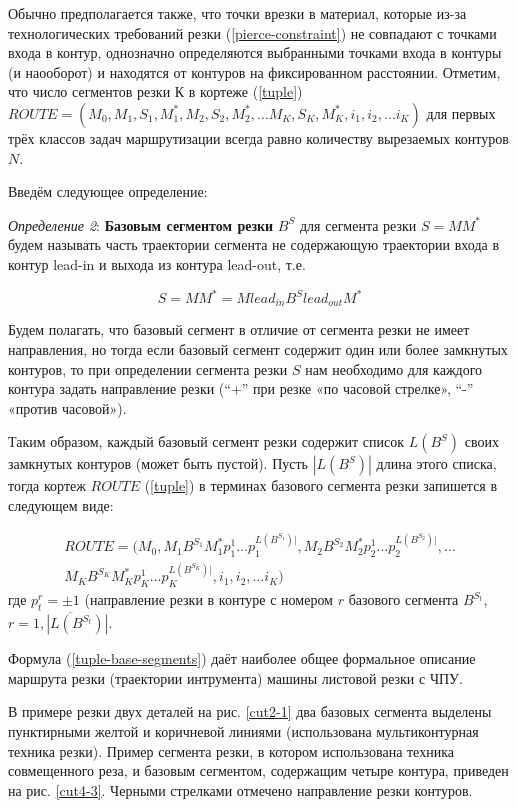 \documentclass[12pt]{report}
\begin{document}
Обычно предполагается также,
что точки врезки в материал,
которые из-за технологических требований резки
(\ref{pierce-constraint})
не совпадают с точками входа в контур,
однозначно определяются выбранными точками входа в контуры (и наооборот)
и находятся от контуров на фиксированном расстоянии.
Отметим, что число сегментов резки К в кортеже (\ref{tuple})
$ROUTE = (
  M_0, M_1, S_1, M_1^*, M_2, S_2, M_2^*, \dots M_K, S_K, M_K^*, i_1, i_2, \dots i_K
)$
для первых трёх классов задач маршрутизации всегда равно количеству вырезаемых контуров $N$.

Введём следующее определение:



{\it Определение 2}:
{\bf Базовым сегментом резки}
$B^S$
для сегмента резки
$S=MM^*$
будем называть часть траектории сегмента
не содержающую траектории входа в контур
lead-in и выхода из контура lead-out, т.е.

\begin{equation}
S=MM^* = M lead_{in} B^S lead_{out} M^*
\label{base-segment}
\end{equation}

Будем полагать,
что базовый сегмент в отличие от сегмента резки
не имеет направления,
но тогда если базовый сегмент содержит
один или более замкнутых контуров,
то при определении сегмента резки $S$
нам необходимо для каждого контура задать направление резки
(“+” при резке «по часовой стрелке», “-” «против часовой»).

Таким образом,
каждый базовый сегмент резки
содержит список
$L(B^S)$
своих замкнутых контуров (может быть пустой).
Пусть
$|L(B^S)|$
длина этого списка, тогда кортеж $ROUTE$ (\ref{tuple})
в терминах базового сегмента резки запишется в следующем виде:

\begin{multline}
  ROUTE = (
    M_0, M_1 B^{S_1} M_1^* p_1^1 \dots p_1^{L(B^{S_1})|},
    M_2 B^{S_2} M_2^* p_2^1 \dots p_2^{L(B^{S_2})|},
    \dots \\
    M_K B^{S_K} M_K^* p_K^1 \dots p_K^{L(B^{S_K})|},
    i_1, i_2, \dots i_K
  )
  \label{tuple-base-segments}
\end{multline}
где $p_t^r=\pm 1$
(направление резки в контуре с номером $r$ базового сегмента  $B^{S_t}$,
$r=\overline{1, |L(B^{S_t})|}$.

Формула (\ref{tuple-base-segments})
даёт наиболее общее формальное описание маршрута резки (траектории интрумента)
машины листовой резки с ЧПУ.

В примере резки двух деталей
на рис. \ref{cut2-1}
два базовых сегмента выделены пунктирными
желтой и коричневой линиями
(использована мультиконтурная техника резки).
Пример сегмента резки, в котором использована техника совмещенного реза,
и  базовым сегментом, содержащим четыре контура,
приведен на рис. \ref{cut4-3}.
Черными стрелками отмечено направление резки контуров.
\end{document}
